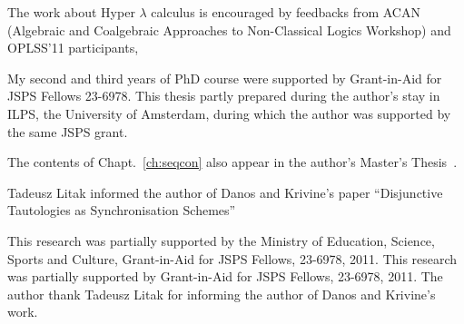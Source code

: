 \begin{acknowledge}
The work about Hyper $\lambda$ calculus is encouraged by feedbacks from
ACAN (Algebraic and
Coalgebraic
Approaches to
Non-Classical Logics Workshop) and OPLSS'11 participants,

My second and third years of PhD course were
supported by Grant-in-Aid for JSPS Fellows 23-6978.
This thesis partly prepared during the author's stay in
ILPS, the University of Amsterdam, during which the author was supported
 by the same JSPS grant.

 The contents of Chapt.~\ref{ch:seqcon} also appear in the author's
 Master's Thesis~\citep{hiraimaster}.

 Tadeusz Litak informed the author of Danos and Krivine's paper
 ``Disjunctive Tautologies as Synchronisation Schemes''

This research was partially supported by the Ministry of Education,
Science, Sports and Culture, Grant-in-Aid for JSPS Fellows, 23-6978, 2011.
This research was partially supported by
Grant-in-Aid for JSPS Fellows, 23-6978, 2011.
The author thank Tadeusz Litak for informing the author of
Danos and Krivine's work.
\end{acknowledge}
